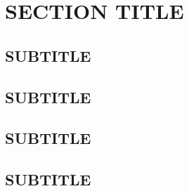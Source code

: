 \documentclass[12pt]{article}
\begin{document}
	
	\section{SECTION TITLE}
	
	
	\subsection{SUBTITLE}
	
	
	\subsection{SUBTITLE}
	
	
	\subsection{SUBTITLE}
	
	
	\subsection{SUBTITLE}
	
	
	\newpage    

	\printbibliography %
\end{document}
